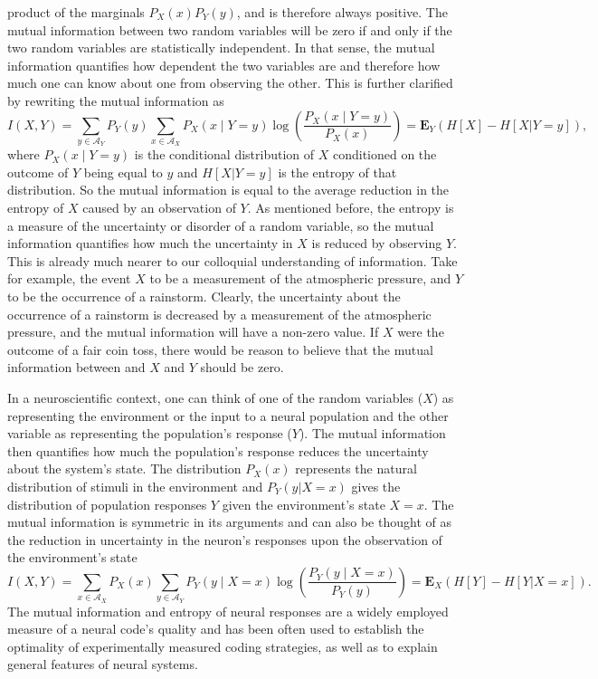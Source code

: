 product of the marginals $P_X(x)P_Y(y)$, and is therefore always positive.
The mutual information between two random variables will be zero if and only if the two random variables are
statistically independent. In that sense, the mutual information quantifies how dependent the two variables are and therefore how much one can know about one from
observing the other. This is further clarified by rewriting the mutual information as
\[
I(X,Y) = \sum_{y \in \mathcal{A}_Y} P_Y(y) \sum_{x\in\mathcal{A}_X} P_{X}\left(x\middle|Y=y\right) \log\left(\frac{ P_{X}\left(x\middle|Y=y\right)}{P_X(x)}\right) =\boldsymbol{E}_Y \left( H\left[X\right] - H\left[X|Y=y\right]\right),
\]
where $ P_{X}\left(x\middle|Y=y\right) $ is the conditional distribution of $X$ conditioned on the outcome of $Y$ being equal to $y$ and $H[X|Y=y]$ is the entropy
of that distribution. So the mutual information is
equal to the average reduction in the entropy of $X$ caused by an observation of $Y$. As mentioned before, the entropy is a measure of the uncertainty or disorder
of a random variable, so the mutual information quantifies how much the uncertainty in $X$ is reduced by observing $Y$. This is already much nearer to our colloquial
understanding of information. Take for example, the event $X$ to be a measurement of the atmospheric pressure, and $Y$ to be the occurrence of a rainstorm. Clearly,
the uncertainty about the occurrence of a rainstorm is decreased by a measurement of the atmospheric pressure, and the mutual information will have a non-zero value. If $X$ were
the outcome of a fair coin toss, there would be reason to believe that the mutual information between and $X$ and $Y$ should be zero.\par
In a neuroscientific context, one can think of one of the random variables ($X$) as representing the environment or the input to a neural population 
and the other variable
as representing the population's response ($Y$). The mutual information then quantifies how much the population's response reduces the uncertainty about the 
system's state. The distribution $P_X(x)$ represents the natural distribution of stimuli in the environment and $P_Y(y|X=x)$ gives the distribution of population 
responses $Y$ given the environment's state $X=x$. The mutual information is symmetric in its arguments and can also be thought of as the reduction in uncertainty in 
the neuron's responses upon the observation of the environment's state
\[
I(X,Y) = \sum_{x \in \mathcal{A}_X} P_X(x) \sum_{y\in\mathcal{A}_Y} P_{Y}\left(y\middle|X=x\right) \log\left(\frac{ P_{Y}\left(y\middle|X=x\right)}{P_Y(y)}\right) =\boldsymbol{E}_X \left( H[Y] - H[Y|X=x]\right).
\]
The mutual information and entropy of neural responses are a widely employed measure of a neural code's quality and has been often used
to establish the optimality of experimentally measured coding strategies, as well as to explain general features of neural systems.\par

